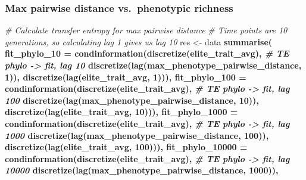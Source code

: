 \documentclass[]{book}
\newenvironment{Shaded}{\begin{snugshade}}{\end{snugshade}}
\newcommand{\CommentTok}[1]{\textcolor[rgb]{0.56,0.35,0.01}{\textit{#1}}}
\newcommand{\DataTypeTok}[1]{\textcolor[rgb]{0.13,0.29,0.53}{#1}}
\newcommand{\DecValTok}[1]{\textcolor[rgb]{0.00,0.00,0.81}{#1}}
\newcommand{\KeywordTok}[1]{\textcolor[rgb]{0.13,0.29,0.53}{\textbf{#1}}}
\newcommand{\NormalTok}[1]{#1}
\newcommand{\OperatorTok}[1]{\textcolor[rgb]{0.81,0.36,0.00}{\textbf{#1}}}
\newcommand{\StringTok}[1]{\textcolor[rgb]{0.31,0.60,0.02}{#1}}
\begin{document}
\hypertarget{max-pairwise-distance-vs.phenotypic-richness}{%
\subsubsection{Max pairwise distance vs.~phenotypic richness}\label{max-pairwise-distance-vs.phenotypic-richness}}

\begin{Shaded}
\begin{Highlighting}[]
\CommentTok{# Calculate transfer entropy for max pairwise distance}
\CommentTok{# Time points are 10 generations, so calculating lag 1 gives us lag 10}
\NormalTok{res <-}\StringTok{ }\NormalTok{data }\OperatorTok{%>%}\StringTok{ }\KeywordTok{group_by}\NormalTok{(directory, selection_name) }\OperatorTok{%>%}
\KeywordTok{summarise}\NormalTok{(}
  \DataTypeTok{fit_phylo_10 =}     \KeywordTok{condinformation}\NormalTok{(}\KeywordTok{discretize}\NormalTok{(elite_trait_avg), }\CommentTok{# TE phylo -> fit, lag 10}
                                     \KeywordTok{discretize}\NormalTok{(}\KeywordTok{lag}\NormalTok{(max_phenotype_pairwise_distance, }\DecValTok{1}\NormalTok{)), }
                                     \KeywordTok{discretize}\NormalTok{(}\KeywordTok{lag}\NormalTok{(elite_trait_avg, }\DecValTok{1}\NormalTok{))),}
  \DataTypeTok{fit_phylo_100 =}    \KeywordTok{condinformation}\NormalTok{(}\KeywordTok{discretize}\NormalTok{(elite_trait_avg), }\CommentTok{# TE phylo -> fit, lag 100}
                                     \KeywordTok{discretize}\NormalTok{(}\KeywordTok{lag}\NormalTok{(max_phenotype_pairwise_distance, }\DecValTok{10}\NormalTok{)), }
                                     \KeywordTok{discretize}\NormalTok{(}\KeywordTok{lag}\NormalTok{(elite_trait_avg, }\DecValTok{10}\NormalTok{))),}
  \DataTypeTok{fit_phylo_1000 =}   \KeywordTok{condinformation}\NormalTok{(}\KeywordTok{discretize}\NormalTok{(elite_trait_avg), }\CommentTok{# TE phylo -> fit, lag 1000}
                                     \KeywordTok{discretize}\NormalTok{(}\KeywordTok{lag}\NormalTok{(max_phenotype_pairwise_distance, }\DecValTok{100}\NormalTok{)), }
                                     \KeywordTok{discretize}\NormalTok{(}\KeywordTok{lag}\NormalTok{(elite_trait_avg, }\DecValTok{100}\NormalTok{))),}
  \DataTypeTok{fit_phylo_10000 =}  \KeywordTok{condinformation}\NormalTok{(}\KeywordTok{discretize}\NormalTok{(elite_trait_avg), }\CommentTok{# TE phylo -> fit, lag 10000}
                                     \KeywordTok{discretize}\NormalTok{(}\KeywordTok{lag}\NormalTok{(max_phenotype_pairwise_distance, }\DecValTok{1000}\NormalTok{)), }
}
\end{Highlighting}
\end{Shaded}
\end{document}
